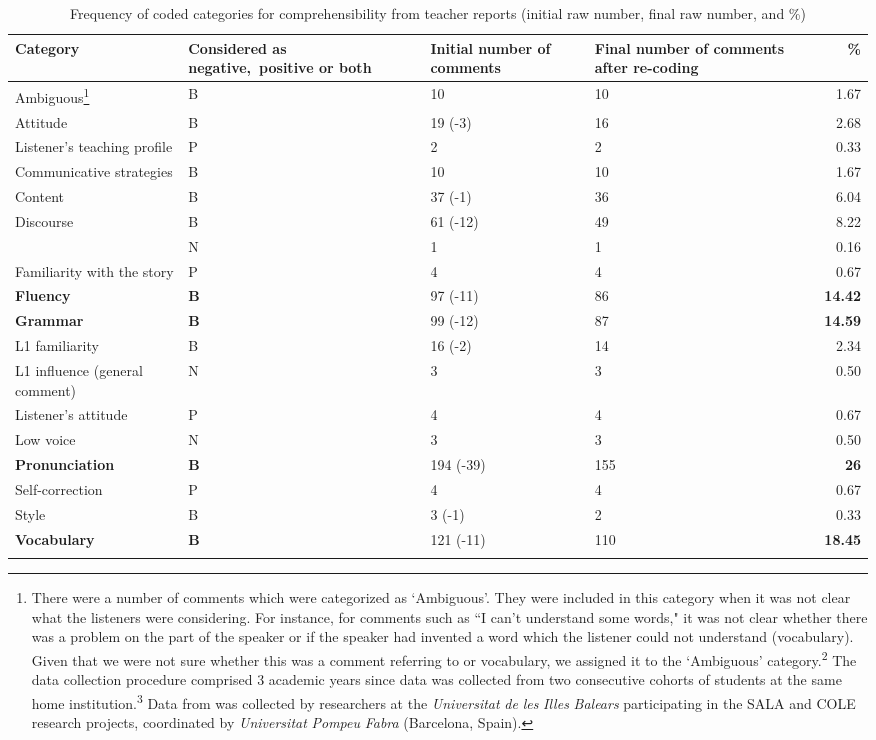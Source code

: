 \documentclass[output=paper]{langsci/langscibook}
\begin{document}
\begin{table}[b]
\caption{Frequency of coded categories for comprehensibility from teacher reports (initial raw number, final raw number, and \%)}
\label{tab:delrio:2}
\footnotesize
\begin{tabularx}{\textwidth}{l@{}Y@{~}Y@{~}Yr}
\lsptoprule
\bfseries Category & \bfseries Considered as \mbox{negative, positive} or both & \bfseries Initial number of comments & \bfseries Final number of comments after re-coding & \bfseries \%\\
\midrule
Ambiguous\footnote{ There were a number of comments which were categorized as ‘Ambiguous’. They were included in this category when it was not clear what the listeners were considering. For instance, for comments such as “I can't understand some words," it was not clear whether there was a  problem on the part of the speaker or if the speaker had invented a word which the listener could not understand (vocabulary). Given that we were not sure  whether this was a comment referring to  or vocabulary, we assigned it to the ‘Ambiguous’ category.\textsuperscript{2} The data collection procedure comprised 3 academic years since data was collected from two consecutive cohorts of students at the same home institution.\textsuperscript{3} Data from  was collected by researchers at the \textit{Universitat} \textit{de} \textit{les} \textit{Illes} \textit{Balears} participating in the SALA and COLE research projects, coordinated by \textit{Universitat} \textit{Pompeu} \textit{Fabra} (Barcelona, Spain).} & B & 10 & 10 & 1.67\\
Attitude & B & 19  (-3) & 16 & 2.68\\
Listener’s teaching profile & P & 2 & 2 & 0.33\\
Communicative strategies & B & 10 & 10 & 1.67\\
Content & B & 37  (-1) & 36 & 6.04\\
Discourse & B & 61  (-12) & 49 & 8.22\\
  & N & 1 & 1 & 0.16\\
Familiarity with the story & P & 4 & 4 & 0.67\\
\textbf{Fluency} & \textbf{B} & 97  (-11) & 86 & \textbf{14.42}\\
\textbf{Grammar} & \textbf{B} & 99  (-12) & 87 & \textbf{14.59}\\
L1 familiarity & B & 16  (-2) & 14 & 2.34\\
L1 influence (general comment) & N & 3 & 3 & 0.50\\
Listener’s attitude & P & 4 & 4 & 0.67\\
Low voice & N & 3 & 3 & 0.50\\
\textbf{Pronunciation} & \textbf{B} & 194   (-39) & 155 & \textbf{26}\\
Self-correction & P & 4 & 4 & 0.67\\
Style & B & 3    (-1) & 2 & 0.33\\
\textbf{Vocabulary} & \textbf{B} & 121   (-11) & 110 & \textbf{18.45}\\
\lspbottomrule
\end{tabularx} 
\end{table}
\end{document}
